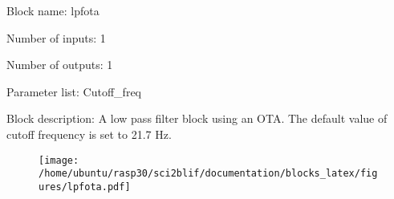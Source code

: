 \pagebreak

Block name: lpfota

Number of inputs: 1

Number of outputs: 1

Parameter list: Cutoff\_freq

Block description: 
A low pass filter block using an OTA. The default value of cutoff frequency is set to 21.7 Hz.

\begin{figure}[H]  %
\texttt{[image: /home/ubuntu/rasp30/sci2blif/documentation/blocks\_latex/figures/lpfota.pdf]}
\end{figure}

